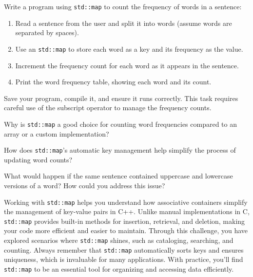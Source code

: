 \begin{challenge}
    \begin{task}
        Write a program using \texttt{std::map} to count the frequency of words in a sentence:
        \begin{enumerate}
            \item Read a sentence from the user and split it into words (assume words are separated by spaces).
            \item Use an \texttt{std::map} to store each word as a key and its frequency as the value.
            \item Increment the frequency count for each word as it appears in the sentence.
            \item Print the word frequency table, showing each word and its count.
        \end{enumerate}

        Save your program, compile it, and ensure it runs correctly. This task requires careful use of the subscript operator to manage the frequency counts.

        \begin{questions}
            \item Why is \texttt{std::map} a good choice for counting word frequencies compared to an array or a custom implementation?
            \item How does \texttt{std::map}'s automatic key management help simplify the process of updating word counts?
            \item What would happen if the same sentence contained uppercase and lowercase versions of a word? How could you address this issue?
        \end{questions}
    \end{task}

    \begin{advise}
        Working with \texttt{std::map} helps you understand how associative containers simplify the management of key-value pairs in C++. 
        Unlike manual implementations in C, \texttt{std::map} provides built-in methods for insertion, retrieval, and deletion, making your code more efficient and easier to maintain. 
        Through this challenge, you have explored scenarios where \texttt{std::map} shines, such as cataloging, searching, and counting. 
        Always remember that \texttt{std::map} automatically sorts keys and ensures uniqueness, which is invaluable for many applications. 
        With practice, you'll find \texttt{std::map} to be an essential tool for organizing and accessing data efficiently.
    \end{advise}
\end{challenge}
